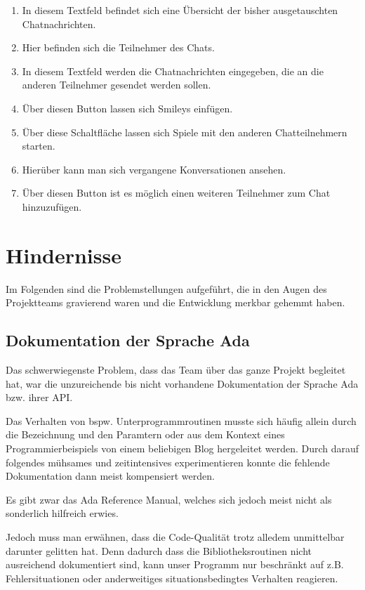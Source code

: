 \documentclass[12pt,a4paper,bibliography=totocnumbered,listof=totocnumbered]{scrartcl}
\begin{document}
\begin{enumerate}
	\item In diesem Textfeld befindet sich eine Übersicht der bisher ausgetauschten Chatnachrichten.
	\item Hier befinden sich die Teilnehmer des Chats.
	\item In diesem Textfeld werden die Chatnachrichten eingegeben, die an die anderen Teilnehmer gesendet werden sollen.
	\item Über diesen Button lassen sich Smileys einfügen.
	\item Über diese Schaltfläche lassen sich Spiele mit den anderen Chatteilnehmern starten.
	\item Hierüber kann man sich vergangene Konversationen ansehen.
	\item Über diesen Button ist es möglich einen weiteren Teilnehmer zum Chat hinzuzufügen.
\end{enumerate}

\newpage
\section{Hindernisse}
Im Folgenden sind die Problemstellungen aufgeführt, die in den Augen des Projektteams gravierend waren und die Entwicklung merkbar gehemmt haben.

\subsection{Dokumentation der Sprache Ada}
Das schwerwiegenste Problem, dass das Team über das ganze Projekt begleitet hat, war die unzureichende bis nicht vorhandene Dokumentation der Sprache Ada bzw. ihrer API.

Das Verhalten von bspw. Unterprogrammroutinen musste sich häufig allein durch die Bezeichnung und den Paramtern oder aus dem Kontext eines Programmierbeispiels von einem beliebigen Blog hergeleitet werden. Durch darauf folgendes mühsames und zeitintensives experimentieren konnte die fehlende Dokumentation dann meist kompensiert werden.

Es gibt zwar das Ada Reference Manual, welches sich jedoch meist nicht als sonderlich hilfreich erwies.

Jedoch muss man erwähnen, dass die Code-Qualität trotz alledem  unmittelbar darunter gelitten hat. Denn dadurch dass die Bibliotheksroutinen nicht ausreichend dokumentiert sind, kann unser Programm nur beschränkt auf z.B. Fehlersituationen oder anderweitiges situationsbedingtes Verhalten reagieren.
\end{document}
